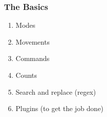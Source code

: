 \begin{frame}[fragile]
  \frametitle{The Basics}
  \begin{enumerate}
    \item Modes
    \item Movements
    \item Commands
    \item Counts
    \item Search and replace (regex)
    \item Plugins (to get the job done)
  \end{enumerate}
\end{frame}
